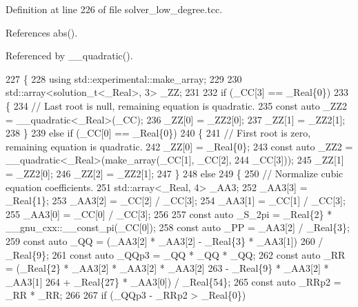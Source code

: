 Definition at line 226 of file solver\+\_\+low\+\_\+degree.\+tcc.



References abs().



Referenced by \+\_\+\+\_\+quadratic().


\begin{DoxyCode}
227     \{
228       \textcolor{keyword}{using} std::experimental::make\_array;
229 
230       std::array<solution\_t<\_Real>, 3> \_ZZ;
231 
232       \textcolor{keywordflow}{if} (\_CC[3] == \_Real\{0\})
233         \{
234           \textcolor{comment}{// Last root is null, remaining equation is quadratic.}
235           \textcolor{keyword}{const} \textcolor{keyword}{auto} \_ZZ2 = \_\_quadratic<\_Real>(\_CC);
236           \_ZZ[0] = \_ZZ2[0];
237           \_ZZ[1] = \_ZZ2[1];
238         \}
239       \textcolor{keywordflow}{else} \textcolor{keywordflow}{if} (\_CC[0] == \_Real\{0\})
240         \{
241           \textcolor{comment}{// First root is zero, remaining equation is quadratic.}
242           \_ZZ[0] = \_Real\{0\};
243           \textcolor{keyword}{const} \textcolor{keyword}{auto} \_ZZ2 = \_\_quadratic<\_Real>(make\_array(\_CC[1], \_CC[2],
244                                                           \_CC[3]));
245           \_ZZ[1] = \_ZZ2[0];
246           \_ZZ[2] = \_ZZ2[1];
247         \}
248       \textcolor{keywordflow}{else}
249         \{
250           \textcolor{comment}{// Normalize cubic equation coefficients.}
251           std::array<\_Real, 4> \_AA3;
252           \_AA3[3] = \_Real\{1\};
253           \_AA3[2] = \_CC[2] / \_CC[3];
254           \_AA3[1] = \_CC[1] / \_CC[3];
255           \_AA3[0] = \_CC[0] / \_CC[3];
256 
257           \textcolor{keyword}{const} \textcolor{keyword}{auto} \_S\_2pi = \_Real\{2\} * \_\_gnu\_cxx::\_\_const\_pi(\_CC[0]);
258           \textcolor{keyword}{const} \textcolor{keyword}{auto} \_PP = \_AA3[2] / \_Real\{3\};
259           \textcolor{keyword}{const} \textcolor{keyword}{auto} \_QQ = (\_AA3[2] * \_AA3[2] - \_Real\{3\} * \_AA3[1])
260                          / \_Real\{9\};
261           \textcolor{keyword}{const} \textcolor{keyword}{auto} \_QQp3 = \_QQ * \_QQ * \_QQ;
262           \textcolor{keyword}{const} \textcolor{keyword}{auto} \_RR = (\_Real\{2\} * \_AA3[2] * \_AA3[2] * \_AA3[2]
263                           - \_Real\{9\} * \_AA3[2] * \_AA3[1]
264                           + \_Real\{27\} * \_AA3[0]) / \_Real\{54\};
265           \textcolor{keyword}{const} \textcolor{keyword}{auto} \_RRp2 = \_RR * \_RR;
266 
267           \textcolor{keywordflow}{if} (\_QQp3 - \_RRp2 > \_Real\{0\})

\end{DoxyCode}
